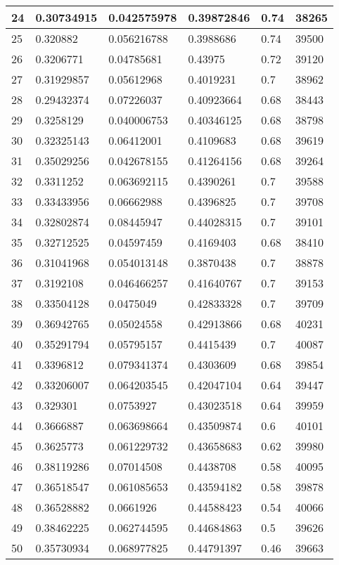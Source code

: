 \begin{longtable}{|l|l|l|l|l|l|}
24 & 0.30734915 & 0.042575978 & 0.39872846 & 0.74 & 38265 \\ \hline 
25 & 0.320882 & 0.056216788 & 0.3988686 & 0.74 & 39500 \\ \hline 
26 & 0.3206771 & 0.04785681 & 0.43975 & 0.72 & 39120 \\ \hline 
27 & 0.31929857 & 0.05612968 & 0.4019231 & 0.7 & 38962 \\ \hline 
28 & 0.29432374 & 0.07226037 & 0.40923664 & 0.68 & 38443 \\ \hline 
29 & 0.3258129 & 0.040006753 & 0.40346125 & 0.68 & 38798 \\ \hline 
30 & 0.32325143 & 0.06412001 & 0.4109683 & 0.68 & 39619 \\ \hline 
31 & 0.35029256 & 0.042678155 & 0.41264156 & 0.68 & 39264 \\ \hline 
32 & 0.3311252 & 0.063692115 & 0.4390261 & 0.7 & 39588 \\ \hline 
33 & 0.33433956 & 0.06662988 & 0.4396825 & 0.7 & 39708 \\ \hline 
34 & 0.32802874 & 0.08445947 & 0.44028315 & 0.7 & 39101 \\ \hline 
35 & 0.32712525 & 0.04597459 & 0.4169403 & 0.68 & 38410 \\ \hline 
36 & 0.31041968 & 0.054013148 & 0.3870438 & 0.7 & 38878 \\ \hline 
37 & 0.3192108 & 0.046466257 & 0.41640767 & 0.7 & 39153 \\ \hline 
38 & 0.33504128 & 0.0475049 & 0.42833328 & 0.7 & 39709 \\ \hline 
39 & 0.36942765 & 0.05024558 & 0.42913866 & 0.68 & 40231 \\ \hline 
40 & 0.35291794 & 0.05795157 & 0.4415439 & 0.7 & 40087 \\ \hline 
41 & 0.3396812 & 0.079341374 & 0.4303609 & 0.68 & 39854 \\ \hline 
42 & 0.33206007 & 0.064203545 & 0.42047104 & 0.64 & 39447 \\ \hline 
43 & 0.329301 & 0.0753927 & 0.43023518 & 0.64 & 39959 \\ \hline 
44 & 0.3666887 & 0.063698664 & 0.43509874 & 0.6 & 40101 \\ \hline 
45 & 0.3625773 & 0.061229732 & 0.43658683 & 0.62 & 39980 \\ \hline 
46 & 0.38119286 & 0.07014508 & 0.4438708 & 0.58 & 40095 \\ \hline 
47 & 0.36518547 & 0.061085653 & 0.43594182 & 0.58 & 39878 \\ \hline 
48 & 0.36528882 & 0.0661926 & 0.44588423 & 0.54 & 40066 \\ \hline 
49 & 0.38462225 & 0.062744595 & 0.44684863 & 0.5 & 39626 \\ \hline 
50 & 0.35730934 & 0.068977825 & 0.44791397 & 0.46 & 39663 \\ \hline 
\end{longtable}